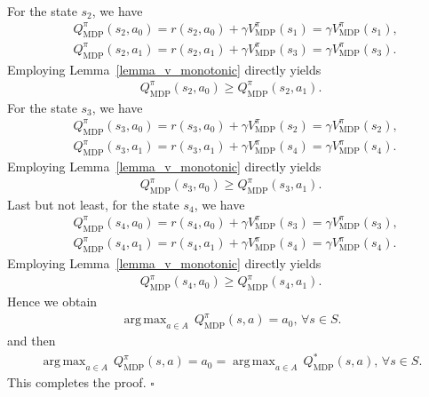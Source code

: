 \documentclass[10pt]{article}
\DeclareMathOperator*{\argmax}{arg\,max}
\newenvironment{myproof}{{\noindent\it Proof. }}{\hfill $\square$ \par}
\begin{document}
\begin{myproof}
\begin{align}
\end{align}
For the state $s_2$, we have
\begin{align}
    &Q_\text{MDP}^{\pi}(s_2, a_0) = r(s_2, a_0) + \gamma V_\text{MDP}^{\pi}(s_1) = \gamma V_\text{MDP}^{\pi}(s_1), \\
    &Q_\text{MDP}^{\pi}(s_2, a_1) = r(s_2, a_1) + \gamma V_\text{MDP}^{\pi}(s_3) = \gamma V_\text{MDP}^{\pi}(s_3).
\end{align}
Employing Lemma~\ref{lemma_v_monotonic} directly yields
\begin{align}
    Q_\text{MDP}^{\pi}(s_2, a_0) \geq Q_\text{MDP}^{\pi}(s_2, a_1).
\end{align}
For the state $s_3$, we have
\begin{align}
    &Q_\text{MDP}^{\pi}(s_3, a_0) = r(s_3, a_0) + \gamma V_\text{MDP}^{\pi}(s_2) = \gamma V_\text{MDP}^{\pi}(s_2), \\
    &Q_\text{MDP}^{\pi}(s_3, a_1) = r(s_3, a_1) + \gamma V_\text{MDP}^{\pi}(s_4) = \gamma V_\text{MDP}^{\pi}(s_4).
\end{align}
Employing Lemma~\ref{lemma_v_monotonic} directly yields
\begin{align}
    Q_\text{MDP}^{\pi}(s_3, a_0) \geq Q_\text{MDP}^{\pi}(s_3, a_1).
\end{align}
Last but not least, for the state $s_4$, we have
\begin{align}
    &Q_\text{MDP}^{\pi}(s_4, a_0) = r(s_4, a_0) + \gamma V_\text{MDP}^{\pi}(s_3) = \gamma V_\text{MDP}^{\pi}(s_3), \\
    &Q_\text{MDP}^{\pi}(s_4, a_1) = r(s_4, a_1) + \gamma V_\text{MDP}^{\pi}(s_4) = \gamma V_\text{MDP}^{\pi}(s_4).
\end{align}
Employing Lemma~\ref{lemma_v_monotonic} directly yields
\begin{align}
    Q_\text{MDP}^{\pi}(s_4, a_0) \geq Q_\text{MDP}^{\pi}(s_4, a_1).
\end{align}
Hence we obtain
\begin{align}
   \argmax_{ a \in A} \, Q_\text{MDP}^{\pi}(s, a)  = a_0, \, \forall s \in S.
\end{align}
and then
\begin{align}
    \argmax_{ a \in A} \, Q_\text{MDP}^{\pi}(s, a) = a_0 =  \argmax_{ a \in A} \, Q_\text{MDP}^*(s, a), \, \forall s \in S.
\end{align}
This completes the proof.
\end{myproof}
\end{document}
